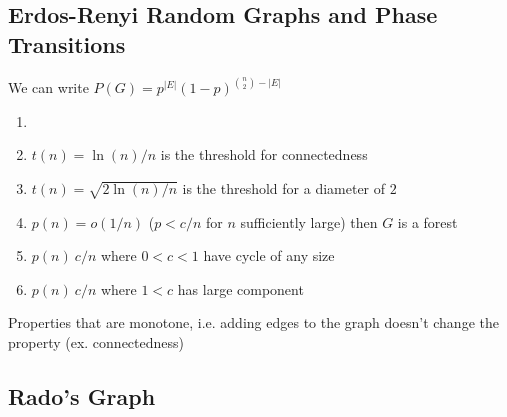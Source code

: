 
\subsection{Erdos-Renyi Random Graphs and Phase Transitions}


\begin{definition}
    \label{def:phase transition probability function}
    We can write \(P(G) = p^{|E|} (1- p)^{{n \choose 2} - |E|}\) 
\end{definition}  

\begin{example}
    \label{ex:threshold function}
    \begin{enumerate}
			\item[]
        \item \(t(n) = \ln (n) / n\) is the threshold for connectedness
        \item \(t(n) = \sqrt{2 \ln(n) / n}\) is the threshold for a diameter of \(2\)
        \item \(p(n) = o(1 / n)\) (\(p < c / n\) for \(n\) sufficiently large) then \(G\) is a forest  
        \item \(p(n) ~ c / n\) where \(0 < c < 1\) have cycle of any size
        \item \(p(n) ~ c / n\) where \(1 < c\) has large component
    \end{enumerate}
\end{example} 

\begin{remark}
    Properties that are monotone, i.e. adding edges to the graph doesn't change the property (ex. connectedness)
\end{remark}

\subsection{Rado's Graph}

